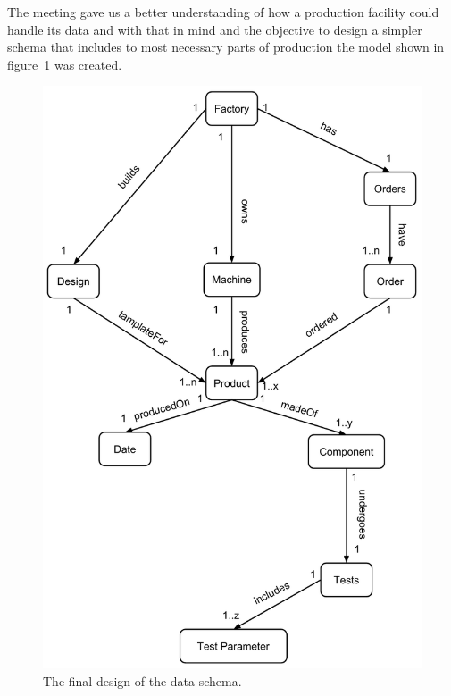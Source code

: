 The meeting gave us a better understanding of how a production facility could handle its data and with that in mind and the objective to design a simpler schema that includes to most necessary parts of production the model shown in figure~\ref{fig:finalDesignOfSchema} was created.

\begin{figure}
  \includegraphics[width=\textwidth]{images/dataStructure}
  \caption{The final design of the data schema.}
  \label{fig:finalDesignOfSchema}
\end{figure}


